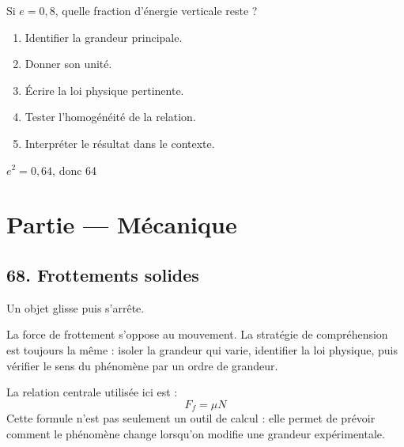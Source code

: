 \documentclass[11pt,a4paper]{article}
\begin{document}
\begin{exercicebox}
Si $e=0{,}8$, quelle fraction d'énergie verticale reste ?
\begin{enumerate}
  \item Identifier la grandeur principale.
  \item Donner son unité.
  \item Écrire la loi physique pertinente.
  \item Tester l'homogénéité de la relation.
  \item Interpréter le résultat dans le contexte.
\end{enumerate}
\end{exercicebox}

\begin{corrigebox}[Indication]
$e^2=0{,}64$, donc 64 %
\end{corrigebox}


\section{Partie — Mécanique}


\subsection{68. Frottements solides}

\begin{exemplebox}
Un objet glisse puis s'arrête.
\end{exemplebox}

\begin{methodebox}
La force de frottement s'oppose au mouvement.
La stratégie de compréhension est toujours la même : isoler la grandeur qui varie, identifier la loi physique, puis vérifier le sens du phénomène par un ordre de grandeur.
\end{methodebox}

\begin{theorembox}
La relation centrale utilisée ici est :
\[
F_f=\mu N
\]
Cette formule n'est pas seulement un outil de calcul : elle permet de prévoir comment le phénomène change lorsqu'on modifie une grandeur expérimentale.
\end{theorembox}
\end{document}
